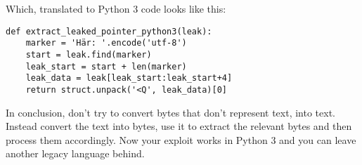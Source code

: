 \documentclass[twocolumn]{article}
\begin{document}
Which, translated to Python 3 code looks like this:

\begin{verbatim}
def extract_leaked_pointer_python3(leak):
    marker = 'Här: '.encode('utf-8')
    start = leak.find(marker)
    leak_start = start + len(marker)
    leak_data = leak[leak_start:leak_start+4]
    return struct.unpack('<Q', leak_data)[0]
\end{verbatim}

In conclusion, don't try to convert bytes that don't represent text, into text. Instead convert the text into bytes, use it to extract the relevant bytes and then process them accordingly. Now your exploit works in Python 3 and you can leave another legacy language behind.
\end{document}
